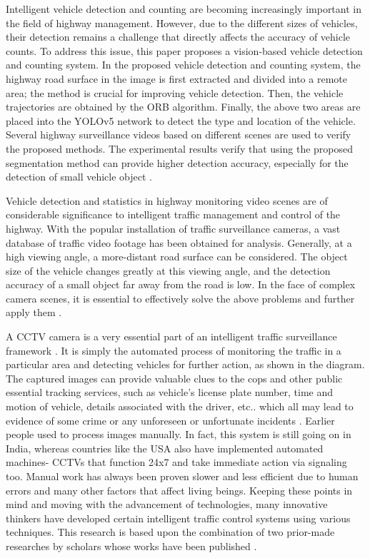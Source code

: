 \begin{sloppypar}
Intelligent vehicle detection and counting are becoming increasingly important in the field of highway management. However, due to the different sizes of vehicles, their detection remains a challenge that directly affects the accuracy of vehicle counts. To address this issue, this paper proposes a vision-based vehicle detection and counting system. In the proposed vehicle detection and counting system, the highway road surface in the image is first extracted and divided into a remote area; the method is crucial for improving vehicle detection. Then, the vehicle trajectories are obtained by the ORB algorithm. Finally, the above two areas are placed into the YOLOv5 network to detect the type and location of the vehicle. Several highway surveillance videos based on different scenes are used to verify the proposed methods. The experimental results verify that using the proposed segmentation method can provide higher detection accuracy, especially for the detection of small vehicle object \cite{SongH2019}. 

Vehicle detection and statistics in highway monitoring video scenes are of considerable significance to intelligent traffic management and control of the highway. With the popular installation of traffic surveillance cameras, a vast database of traffic video footage has been obtained for analysis. Generally, at a high viewing angle, a more-distant road surface can be considered. The object size of the vehicle changes greatly at this viewing angle, and the detection accuracy of a small object far away from the road is low. In the face of complex camera scenes, it is essential to effectively solve the above problems and further apply them \cite{SongH2019}. 

A CCTV camera is a very essential part of an intelligent traffic surveillance framework . It is simply the automated process of monitoring the traffic in a particular area and detecting vehicles for further action, as shown in the diagram. The captured images can provide valuable clues to the cops and other public essential tracking services, such as vehicle’s license plate number, time and motion of vehicle, details associated with the driver, etc.. which all may lead to evidence of some crime or any unforeseen or unfortunate incidents . Earlier people used to process images manually. In fact, this system is still going on in India, whereas countries like the USA also have implemented automated machines- CCTVs that function 24x7 and take immediate action via signaling too. Manual work has always been proven slower and less efficient due to human errors and many other factors that affect living beings. Keeping these points in mind and moving with the advancement of technologies, many innovative thinkers have developed certain intelligent traffic control systems using various techniques. This research is based upon the combination of two prior-made researches by scholars whose works have been published \cite{Baran2016}.

\end{sloppypar}

